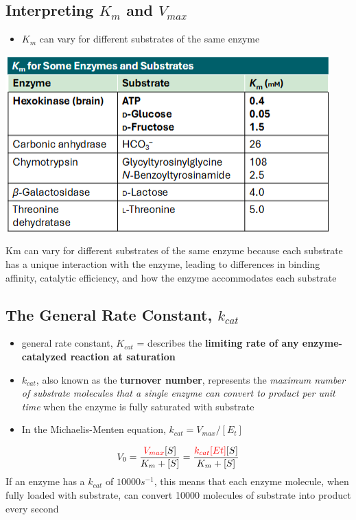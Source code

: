 \documentclass[10pt]{article}
\begin{document}
\subsection*{Interpreting $K_m$ and $V_{max}$}
\begin{itemize}
    \item $K_m$ can vary for different substrates of the same enzyme
\end{itemize}
\begin{center}
    \includegraphics*[scale=1]{L1_8.png}
\end{center}
Km can vary for different substrates of the same enzyme because each substrate has a unique interaction with the enzyme, leading to differences in binding affinity, catalytic efficiency, and how the enzyme accommodates each substrate

\subsection*{The General Rate Constant, $k_{cat}$}
\begin{itemize}
    \item general rate constant, $K_{cat}$ = describes the \textbf{limiting rate of any enzyme-catalyzed reaction at saturation}
    \item $k_{cat}$, also known as the \textbf{turnover number}, represents the \textit{maximum number of substrate molecules that a single enzyme can convert to product per unit time} when the enzyme is fully saturated with substrate
    \item In the Michaelis-Menten equation, $k_{cat} = V_{max}/[E_t]$
\end{itemize}
\[V_0 = \frac{\textcolor{red}{V_{max}}[S]}{K_m + [S]} = \frac{\textcolor{red}{k_{cat}[Et]}[S]}{K_m + [S]}\]
If an enzyme has a $k_{cat}$ of $10000 s^{-1}$, this means that each enzyme molecule, when fully loaded with substrate, can convert 10000 molecules of substrate into product every second
\end{document}
